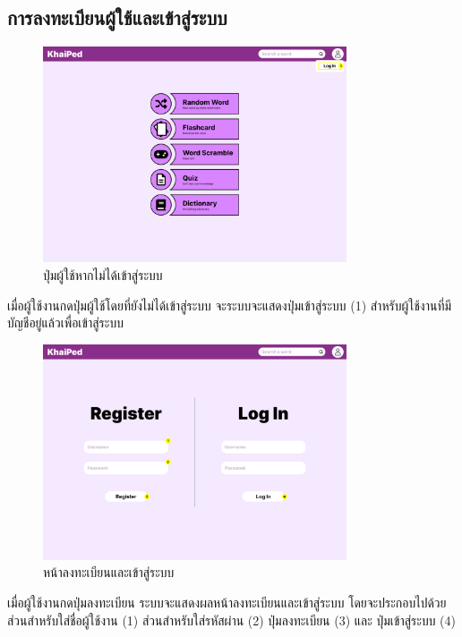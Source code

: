\documentclass[12pt,oneside,openright,a4paper]{cpe-thai-project}
\begin{document}
\subsection{การลงทะเบียนผู้ใช้และเข้าสู่ระบบ}
\begin{figure}[!h]\centering
	\includegraphics[width=0.8\textwidth, keepaspectratio=true]{image/chap3/ui/login/Home page - Guest User Button.png}
	\caption{ปุ่มผู้ใช้หากไม่ได้เข้าสู่ระบบ}\label{fig:UI_GuestButton}
\end{figure}
\hspace{1cm}
เมื่อผู้ใช้งานกดปุ่มผู้ใช้โดยที่ยังไม่ได้เข้าสู่ระบบ จะระบบจะแสดงปุ่มเข้าสู่ระบบ (1) สำหรับผู้ใช้งานที่มีบัญชีอยู่แล้วเพื่อเข้าสู่ระบบ

\begin{figure}[!h]\centering
	\includegraphics[width=0.8\textwidth, keepaspectratio=true]{image/chap3/ui/login/Home page - Register.png}
	\caption{หน้าลงทะเบียนและเข้าสู่ระบบ}\label{fig:UI_LoginPage}
\end{figure}
\hspace{1cm}
เมื่อผู้ใช้งานกดปุ่มลงทะเบียน ระบบจะแสดงผลหน้าลงทะเบียนและเข้าสู่ระบบ โดยจะประกอบไปด้วยส่วนสำหรับใส่ชื่อผู้ใช้งาน (1)
ส่วนสำหรับใส่รหัสผ่าน (2) ปุ่มลงทะเบียน (3) และ ปุ่มเข้าสู่ระบบ (4)
\end{document}
